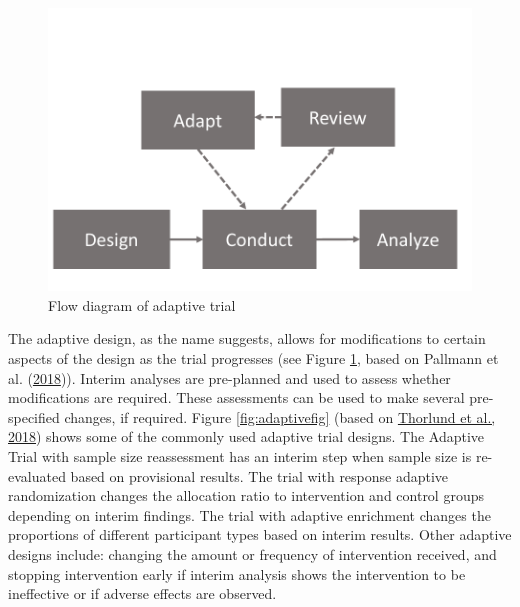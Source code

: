 \documentclass{krantz}
\begin{document}
\begin{figure}

{\centering \includegraphics[width=0.5\linewidth]{images_bw/adaptive_flow} 

}

\caption{Flow diagram of adaptive trial}\label{fig:adaptiveflow}
\end{figure}

The adaptive design, as the name suggests, allows for modifications to certain aspects of the design as the trial progresses (see Figure \ref{fig:adaptiveflow}, based on Pallmann et al. (\protect\hyperlink{ref-pallmann2018}{2018})). Interim analyses are pre-planned and used to assess whether modifications are required. These assessments can be used to make several pre-specified changes, if required. Figure \ref{fig:adaptivefig} (based on \protect\hyperlink{ref-thorlund2018}{Thorlund et al., 2018}) shows some of the commonly used adaptive trial designs. The Adaptive Trial with sample size reassessment has an interim step when sample size is re-evaluated based on provisional results. The trial with response adaptive randomization changes the allocation ratio to intervention and control groups depending on interim findings. The trial with adaptive enrichment changes the proportions of different participant types based on interim results. Other adaptive designs include: changing the amount or frequency of intervention received, and stopping intervention early if interim analysis shows the intervention to be ineffective or if adverse effects are observed.
\end{document}
